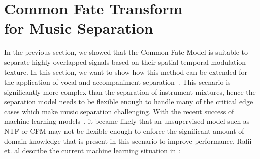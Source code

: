\section[Common Fate Transform for Music Separation]{Common Fate Transform\\for Music Separation}%
\label{sec:cft_for_lead_accompaniment_separation}

In the previous section, we showed that the Common Fate Model is suitable to separate highly overlapped signals based on their spatial-temporal modulation texture.
In this section, we want to show how this method can be extended for the application of vocal and accompaniment separation~\cite{rafii}.
This scenario is significantly more complex than the separation of instrument mixtures, hence the separation model needs to be flexible enough to handle many of the critical edge cases which make music separation challenging.
With the recent success of machine learning models~\cite{HintonSpeech}, it became likely that an unsupervised model such as NTF or CFM may not be flexible enough to enforce the significant amount of domain knowledge that is present in this scenario to improve performance.
Rafii et. al describe the current machine learning situation in \cite{rafii}:

